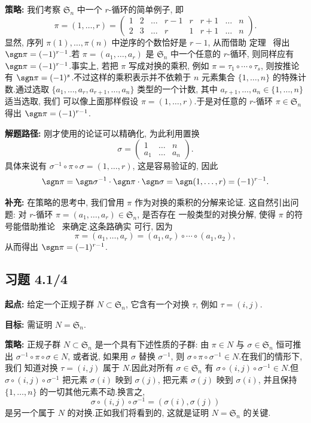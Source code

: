 \noindent\textbf{策略:} 我们考察 $\mathfrak{S}_n$ 中一个 $r$-循环的简单例子, 即
\[
\pi = (1, \ldots, r) = \begin{pmatrix} 1 & 2 & \ldots & r - 1 & r & r + 1 & \ldots & n \\ 2 & 3 & \ldots & r & 1 & r + 1 & \ldots & n \end{pmatrix}\text{.}
\]
显然, 序列 $\pi(1), \ldots, \pi(n)$ 中逆序的个数恰好是 $r - 1$, 从而借助
定理~ 得出 $\sgn \pi = (-1)^{r-1}$.若 $\pi = (a_1, \ldots, a_r)$
是 $\mathfrak{S}_n$ 中一个任意的 $r$-循环, 则同样应有
$\sgn \pi = (-1)^{r-1}$.事实上, 若把 $\pi$ 写成对换的乘积, 例如
$\pi = \tau_1 \circ \cdots \circ \tau_s$, 则按推论~ 有
$\sgn \pi = (-1)^s$.不过这样的乘积表示并不依赖于 $n$ 元素集合
$\{1, \ldots, n\}$ 的特殊计数.通过选取 $\{a_1, \ldots, a_r, a_{r+1}, \ldots, a_n\}$
类型的一个计数, 其中 $a_{r+1}, \ldots, a_n \in \{1, \ldots, n\}$ 适当选取, 我们
可以像上面那样假设 $\pi = (1, \ldots, r)$.于是对任意的 $r$-循环
$\pi \in \mathfrak{S}_n$ 得出 $\sgn \pi = (-1)^{r-1}$.

\noindent\textbf{解题路径:} 刚才使用的论证可以精确化, 为此利用置换
\[
\sigma = \begin{pmatrix} 1 & \ldots & n \\ a_1 & \ldots & a_n \end{pmatrix}\text{.}
\]
具体来说有 $\sigma^{-1} \circ \pi \circ \sigma = (1, \ldots, r)$, 这是容易验证的,
因此
\[
\sgn \pi = \sgn \sigma^{-1} \cdot \sgn \pi \cdot \sgn \sigma = \sgn(1, \ldots, r) = (-1)^{r-1}\text{.}
\]

\noindent\textbf{补充:} 在策略的思考中, 我们曾用 $\pi$ 作为对换的乘积的分解来论证.
这自然引出问题: 对 $r$-循环 $\pi = (a_1, \ldots, a_r) \in \mathfrak{S}_n$, 是否存在
一般类型的对换分解, 使得 $\pi$ 的符号能借助推论~ 来确定.这条路确实
可行, 因为
\[
\pi = (a_1, \ldots, a_r) = (a_1, a_r) \circ \cdots \circ (a_1, a_2),
\]
从而得出 $\sgn \pi = (-1)^{r-1}$.

\subsection*{习题 4.1/4}

\noindent\textbf{起点:} 给定一个正规子群 $N \subset \mathfrak{S}_n$, 它含有一个对换
$\tau$, 例如 $\tau = (i, j)$.

\noindent\textbf{目标:} 需证明 $N = \mathfrak{S}_n$.

\noindent\textbf{策略:} 正规子群 $N \subset \mathfrak{S}_n$ 是一个具有下述性质的子群:
由 $\pi \in N$ 与 $\sigma \in \mathfrak{S}_n$ 恒可推出
$\sigma^{-1} \circ \pi \circ \sigma \in N$, 或者说, 如果用 $\sigma$ 替换
$\sigma^{-1}$, 则 $\sigma \circ \pi \circ \sigma^{-1} \in N$.在我们的情形下, 我们
知道对换 $\tau = (i, j)$ 属于 $N$.因此对所有 $\sigma \in \mathfrak{S}_n$ 有
$\sigma \circ (i, j) \circ \sigma^{-1} \in N$.但 $\sigma \circ (i, j) \circ
\sigma^{-1}$ 把元素 $\sigma(i)$ 映到 $\sigma(j)$, 把元素 $\sigma(j)$ 映到
$\sigma(i)$, 并且保持 $\{1, \ldots, n\}$ 的一切其他元素不动.换言之,
\[
\sigma \circ (i, j) \circ \sigma^{-1} = (\sigma(i), \sigma(j))
\]
是另一个属于 $N$ 的对换.正如我们将看到的, 这就是证明 $N = \mathfrak{S}_n$ 的关键.

